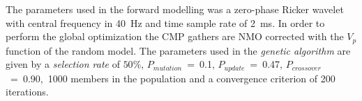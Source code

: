 \documentclass{vie16}
\begin{document}
\begin{table}
\caption{Model parameters.}
\end{table}

The parameters used in the forward modelling was a zero-phase
Ricker wavelet with central frequency in 40~Hz and time sample
rate of 2~ms. In order to perform the global optimization the
CMP gathers are NMO corrected with the $V_{p}$ function of the
random model.
The parameters used in the \textit{genetic algorithm} are given
by a \textit{selection rate} of $50\%$, $P_{mutation}$~=~0.1,
$P_{update}$~=~0.47, $P_{crossover}$~=~0.90,~1000 members in the
population and a convergence criterion of 200 iterations.
\end{document}
